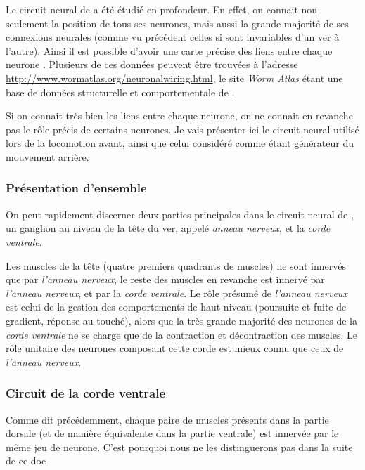 Le circuit neural de \celeg{} a été étudié en profondeur. En effet, on connait
non seulement la position de tous ses neurones, mais aussi la grande majorité
de ses connexions neurales (comme vu précédent celles si sont invariables d'un
ver à l'autre).  Ainsi il est possible d'avoir une carte précise des liens
entre chaque neurone \cite{Durbin1987,Chen2006,Boyle2009,Varshney2011}.
Plusieurs de ces données peuvent être trouvées à l'adresse
\url{http://www.wormatlas.org/neuronalwiring.html}, le site \textit{Worm Atlas}
étant une base de données structurelle et comportementale de \celeg{}.

Si on connait très bien les liens entre chaque neurone, on ne connait en
revanche pas le rôle précis de certains neurones. Je vais présenter ici le
circuit neural utilisé lors de la locomotion avant, ainsi que celui
considéré comme étant générateur du mouvement arrière.

\subsubsection{Présentation d'ensemble} %
\label{ssub:Présentation d'ensemble}

On peut rapidement discerner deux parties principales dans le circuit neural de
\celeg{}, un ganglion au niveau de la tête du ver, appelé \textit{anneau
nerveux}, et la \textit{corde ventrale}.

Les muscles de la tête (quatre premiers quadrants de muscles) ne sont innervés que
par \textit{l'anneau nerveux}, le reste des muscles en revanche est innervé
par \textit{l'anneau nerveux}, et par la \textit{corde ventrale}.  Le rôle
présumé de \textit{l'anneau nerveux} est celui de la gestion des comportements
de haut niveau (poursuite et fuite de gradient, réponse au touché), alors que la
très grande majorité des neurones de la \textit{corde ventrale} ne se charge que
de la contraction et décontraction des muscles. Le rôle unitaire des neurones
composant cette corde est mieux connu que ceux de \textit{l'anneau nerveux}.


\subsubsection{Circuit de la corde ventrale} %
\label{ssub:Circuit de la corde ventrale}

Comme dit précédemment, chaque paire de muscles présents dans la partie dorsale
(et de manière équivalente dans la partie ventrale) est innervée par le même
jeu de neurone. C'est pourquoi nous ne les distinguerons pas dans la
suite de ce doc

